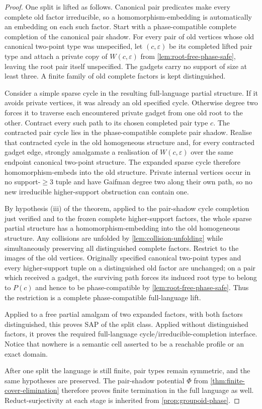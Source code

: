 \begin{proof}
One split is lifted as follows.  Canonical pair predicates make every complete
old factor irreducible, so a homomorphism-embedding is automatically an
embedding on each such factor.  Start with a phase-compatible complete
completion of the canonical pair shadow.  For every pair of old vertices
whose old canonical two-point type was unspecified, let $(c,\varepsilon)$ be
its completed lifted pair type and attach a private copy of
$W(c,\varepsilon)$ from \cref{lem:root-free-phase-safe}, leaving the root pair
itself unspecified.  The gadgets carry no support of size at least three.  A
finite family of old complete factors is kept distinguished.

Consider a simple sparse cycle in the resulting full-language partial
structure.  If it avoids private vertices, it was already an old specified
cycle.  Otherwise degree two forces it to traverse each encountered private
gadget from one old root to the other.  Contract every such path to its chosen
completed pair type $c$.  The contracted pair cycle lies in the
phase-compatible complete pair shadow.  Realise that contracted cycle in the
old homogeneous structure and, for every contracted gadget edge, strongly
amalgamate a realisation of $W(c,\varepsilon)$ over the same endpoint
canonical two-point structure.  The expanded sparse cycle therefore
homomorphism-embeds into the old structure.  Private internal vertices occur
in no support-$\ge3$ tuple and have Gaifman degree two along their own path,
so no new irreducible higher-support obstruction can contain one.

By hypothesis (iii) of the theorem, applied
to the pair-shadow cycle completion just verified and to the frozen complete
higher-support factors, the whole sparse partial structure has a
homomorphism-embedding into the old homogeneous structure.  Any
collisions are unfolded by \cref{lem:collision-unfolding} while simultaneously
preserving all distinguished complete factors.  Restrict to the images of the
old vertices.  Originally specified canonical two-point types and every
higher-support tuple on a distinguished old factor are unchanged; on a pair
which received a gadget, the surviving path forces its induced root type to
belong to $P(c)$ and hence to be phase-compatible by
\cref{lem:root-free-phase-safe}.  Thus the restriction is a complete
phase-compatible full-language lift.

Applied to a free partial amalgam of two expanded factors, with both factors
distinguished, this proves SAP of the split class.  Applied without
distinguished factors, it proves the required full-language
cycle/irreducible-completion interface.  Notice that nowhere is a semantic
cell asserted to be a reachable profile or an exact domain.

After one split the language is still finite, pair types remain symmetric,
and the same hypotheses are preserved.  The pair-shadow potential $\Phi$ from
\cref{thm:finite-cover-elimination} therefore proves finite termination in the
full language as well.  Reduct-surjectivity at each stage is inherited from
\cref{prop:groupoid-phase}.
\end{proof}


